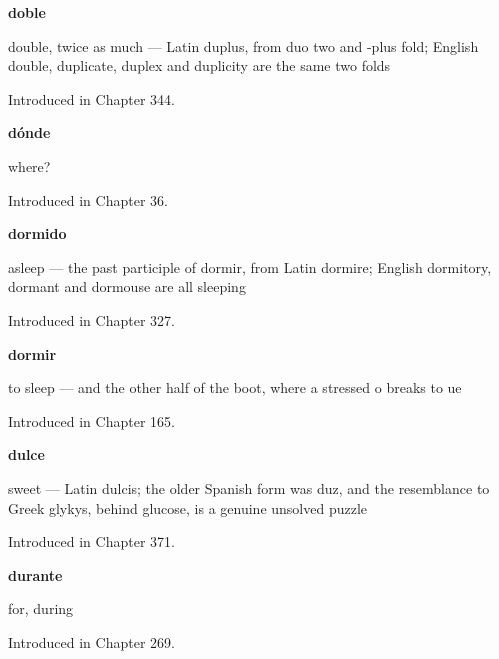 \noindent\begin{minipage}[t]{\linewidth}
\raggedright
\textbf{doble}\par
\small double, twice as much — Latin duplus, from duo two and -plus fold; English double, duplicate, duplex and duplicity are the same two folds\par
\footnotesize Introduced in Chapter 344.
\end{minipage}\par\medskip

\noindent\begin{minipage}[t]{\linewidth}
\raggedright
\textbf{dónde}\par
\small where?\par
\footnotesize Introduced in Chapter 36.
\end{minipage}\par\medskip

\noindent\begin{minipage}[t]{\linewidth}
\raggedright
\textbf{dormido}\par
\small asleep — the past participle of dormir, from Latin dormire; English dormitory, dormant and dormouse are all sleeping\par
\footnotesize Introduced in Chapter 327.
\end{minipage}\par\medskip

\noindent\begin{minipage}[t]{\linewidth}
\raggedright
\textbf{dormir}\par
\small to sleep — and the other half of the boot, where a stressed o breaks to ue\par
\footnotesize Introduced in Chapter 165.
\end{minipage}\par\medskip

\noindent\begin{minipage}[t]{\linewidth}
\raggedright
\textbf{dulce}\par
\small sweet — Latin dulcis; the older Spanish form was duz, and the resemblance to Greek glykys, behind glucose, is a genuine unsolved puzzle\par
\footnotesize Introduced in Chapter 371.
\end{minipage}\par\medskip

\noindent\begin{minipage}[t]{\linewidth}
\raggedright
\textbf{durante}\par
\small for, during\par
\footnotesize Introduced in Chapter 269.
\end{minipage}\par\medskip

